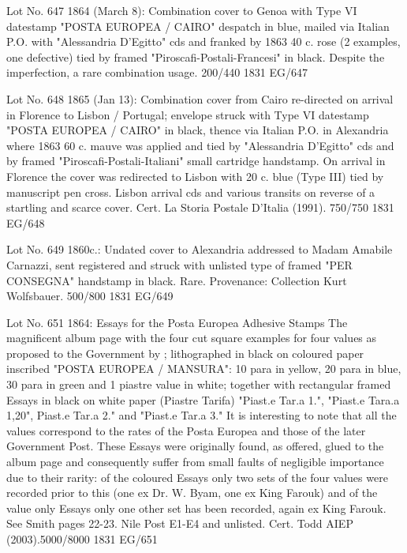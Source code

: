 \documentclass[justified]{tufte-book}
\begin{document}
%
{Lot No. 647
1864 (March 8): Combination cover to Genoa with Type VI datestamp "POSTA EUROPEA / CAIRO" despatch in blue, mailed via Italian P.O. with "Alessandria D'Egitto" cds and franked by 1863 40 c. rose (2 examples, one defective) tied by framed  "Piroscafi-Postali-Francesi" in black. Despite the imperfection, a rare combination usage.  200/440
 }%
{1831}%
{EG/647}%
{}%
{}
{}%
{}

%
{Lot No. 648
1865 (Jan 13): Combination cover from Cairo re-directed on arrival in Florence to Lisbon / Portugal; envelope struck with Type VI datestamp "POSTA EUROPEA / CAIRO" in black, thence via Italian P.O. in Alexandria where 1863 60 c. mauve was applied and tied by "Alessandria D'Egitto" cds and by framed "Piroscafi-Postali-Italiani" small cartridge handstamp. On arrival in Florence the cover was redirected to Lisbon with 20 c. blue (Type III) tied by manuscript pen cross. Lisbon arrival cds and various transits on reverse of a startling and scarce cover. Cert. La Storia Postale D'Italia (1991). 750/750
 }%
{1831}%
{EG/648}%
{}%
{}
{}%
{}


%
{Lot No. 649
1860c.: Undated cover to Alexandria addressed to Madam Amabile Carnazzi, sent registered and struck with unlisted type of framed "PER CONSEGNA" handstamp in black. Rare. Provenance: Collection Kurt Wolfsbauer. 500/800
 }%
{1831}%
{EG/649}%
{}%
{}
{}%
{}





%
{
Lot No. 651
1864: Essays for the Posta Europea Adhesive Stamps The magnificent album page with the four cut square examples for four values as proposed to the Government by ; lithographed in black on coloured paper inscribed "POSTA EUROPEA / MANSURA": 10 para in yellow, 20 para in blue, 30 para in green and 1 piastre value in white; together with rectangular framed Essays in black on white paper (Piastre Tarifa) "Piast.e Tar.a 1.", "Piast.e Tara.a 1,20", Piast.e Tar.a 2." and "Piast.e Tar.a 3." It is interesting to note that all the values correspond to the rates of the Posta Europea and those of the later Government Post. These Essays were originally found, as offered, glued to the album page and consequently suffer from small faults of negligible importance due to their rarity: of the coloured Essays only two sets of the four values were recorded prior to this (one ex Dr. W. Byam, one ex King Farouk) and of the value only Essays only one other set has been recorded, again ex King Farouk. See Smith pages 22-23. Nile Post E1-E4 and unlisted. Cert. Todd AIEP (2003).5000/8000 }%
{1831}%
{EG/651}%
{}%
{}
{}%
{}
\end{document}
